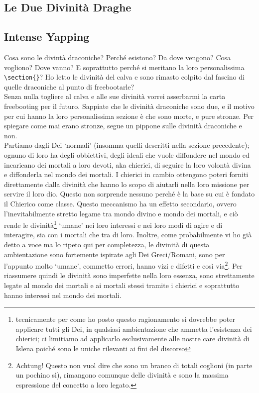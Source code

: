 \documentclass[10pt, a4paper]{report}
\begin{document}
\newpage
\begin{multicols}{2}
\section{Le Due Divinità Draghe}
\subsection*{Intense Yapping}
Cosa sono le divintà draconiche? Perché esistono? Da dove vengono? Cosa vogliono? Dove vanno? E soprattutto perché si meritano la loro personalissima \verb|\section{}|?
Ho letto le divinità del calva e sono rimasto colpito dal fascino di quelle draconiche al punto di freebootarle? \\
Senza nulla togliere al calva e alle sue divinità vorrei asserbarmi la carta freebooting per il futuro. Sappiate che le divinità draconiche sono due, e il motivo per cui hanno la loro personalissima sezione è che sono morte, e pure stronze. Per spiegare come mai erano stronze, segue un pippone sulle divinità draconiche e non.\\
Partiamo dagli Dei \enquote*{normali} (insomma quelli descritti nella sezione precedente); ognuno di loro ha degli obbiettivi, degli ideali che vuole diffondere nel mondo ed incaricano dei mortali a loro devoti, aka chierici, di seguire la loro volontà divina e diffonderla nel mondo dei mortali. I chierici in cambio ottengono poteri forniti direttamente dalla divinità che hanno lo scopo di aiutarli nella loro missione per servire il loro dio. Questo non sorprende nessuno perché è la base su cui è fondato il Chierico come classe. Questo meccanismo ha un effetto secondario, ovvero l'inevitabilmente stretto legame tra mondo divino e mondo dei mortali, e ciò rende le divinità\footnote{tecnicamente per come ho posto questo ragionamento si dovrebbe poter applicare tutti gli Dei, in qualsiasi ambientazione che ammetta l'esistenza dei chierici; ci limitiamo ad applicarlo esclusivamente alle nostre care divinità di Islena poiché sono le uniche rilevanti ai fini del discorso} \enquote*{umane} nei loro interessi e nei loro modi di agire e di interagire, sia con i mortali che tra di loro. Inoltre, come probabilmente vi ho già detto a voce ma lo ripeto qui per completezza, le divinità di questa ambientazione sono fortemente ispirate agli Dei Greci/Romani, sono per l'appunto molto \enquote*{umane}, commetto errori, hanno vizi e difetti e così via\footnote{Achtung! Questo non vuol dire che sono un branco di totali coglioni (in parte un pochino sì), rimangono comunque delle divinità e sono la massima espressione del concetto a loro legato.}. Per riassumere quindi le divinità sono imperfette nella loro essenza, sono strettamente legate al mondo dei mortali e ai mortali stessi tramite i chierici e soprattutto hanno interessi nel mondo dei mortali. \\

\end{multicols}
\end{document}
